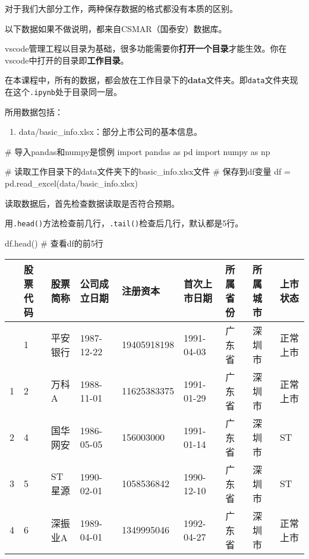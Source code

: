 \documentclass[
  letterpaper,
  DIV=11,
  numbers=noendperiod]{scrreprt}
\newenvironment{Shaded}{\begin{snugshade}}{\end{snugshade}}
\newcommand{\CommentTok}[1]{\textcolor[rgb]{0.37,0.37,0.37}{#1}}
\newcommand{\ImportTok}[1]{\textcolor[rgb]{0.00,0.46,0.62}{#1}}
\newcommand{\NormalTok}[1]{\textcolor[rgb]{0.00,0.23,0.31}{#1}}
\newcommand{\OperatorTok}[1]{\textcolor[rgb]{0.37,0.37,0.37}{#1}}
\newcommand{\StringTok}[1]{\textcolor[rgb]{0.13,0.47,0.30}{#1}}
\providecommand{\tightlist}{%
  \setlength{\itemsep}{0pt}\setlength{\parskip}{0pt}}\usepackage{longtable,booktabs,array}
\begin{document}
对于我们大部分工作，两种保存数据的格式都没有本质的区别。

以下数据如果不做说明，都来自CSMAR（国泰安）数据库。

vscode管理工程以目录为基础，很多功能需要你\textbf{打开一个目录}才能生效。你在vscode中打开的目录即\textbf{工作目录}。

在本课程中，所有的数据，都会放在工作目录下的\textbf{data}文件夹。即\texttt{data}文件夹现在这个\texttt{.ipynb}处于目录同一层。

所用数据包括：

\begin{enumerate}
\def\labelenumi{\arabic{enumi}.}
\tightlist
\item
  data/basic\_info.xlsx：部分上市公司的基本信息。
\end{enumerate}

\begin{Shaded}
\begin{Highlighting}[]
\CommentTok{\# 导入pandas和numpy是惯例}
\ImportTok{import}\NormalTok{ pandas }\ImportTok{as}\NormalTok{ pd}
\ImportTok{import}\NormalTok{ numpy }\ImportTok{as}\NormalTok{ np}

\CommentTok{\# 读取工作目录下的data文件夹下的basic\_info.xlsx文件}
\CommentTok{\# 保存到df变量}
\NormalTok{df }\OperatorTok{=}\NormalTok{ pd.read\_excel(}\StringTok{\textquotesingle{}data/basic\_info.xlsx\textquotesingle{}}\NormalTok{) }
\end{Highlighting}
\end{Shaded}

读取数据后，首先检查数据读取是否符合预期。

用\texttt{.head()}方法检查前几行，\texttt{.tail()}检查后几行，默认都是5行。

\begin{Shaded}
\begin{Highlighting}[]
\NormalTok{df.head() }\CommentTok{\# 查看df的前5行}
\end{Highlighting}
\end{Shaded}

\begin{longtable}[]{@{}lllllllll@{}}
\toprule\noalign{}
& 股票代码 & 股票简称 & 公司成立日期 & 注册资本 & 首次上市日期 &
所属省份 & 所属城市 & 上市状态 \\
\midrule\noalign{}
\endhead
\bottomrule\noalign{}
\endlastfoot
0 & 1 & 平安银行 & 1987-12-22 & 19405918198 & 1991-04-03 & 广东省 &
深圳市 & 正常上市 \\
1 & 2 & 万科A & 1988-11-01 & 11625383375 & 1991-01-29 & 广东省 & 深圳市
& 正常上市 \\
2 & 4 & 国华网安 & 1986-05-05 & 156003000 & 1991-01-14 & 广东省 & 深圳市
& ST \\
3 & 5 & ST 星源 & 1990-02-01 & 1058536842 & 1990-12-10 & 广东省 & 深圳市
& ST \\
4 & 6 & 深振业A & 1989-04-01 & 1349995046 & 1992-04-27 & 广东省 & 深圳市
& 正常上市 \\
\end{longtable}
\end{document}

